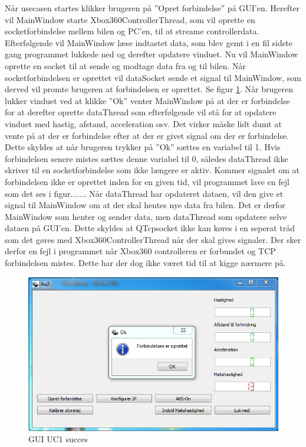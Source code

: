 Når usecasen startes klikker brugeren på ''Opret forbindelse'' på GUI'en. Herefter vil MainWindow starte Xbox360ControllerThread, som vil oprette en socketforbindelse mellem bilen og PC'en, til at streame controllerdata. Efterfølgende vil MainWindow læse indtastet data, som blev gemt i en fil sidste gang programmet lukkede ned og derefter opdatere vinduet. Nu vil MainWindow oprette en socket til at sende og modtage data fra og til bilen. Når socketforbindelsen er oprettet vil dataSocket sende et signal til MainWindow, som derved vil promte brugeren at forbindelsen er oprettet. Se figur \ref{fig:GUI_uc1_success}. Når brugeren lukker vinduet ved at klikke ''Ok'' venter MainWindow på at der er forbindelse for at derefter oprette dataThread som efterfølgende vil stå for at opdatere vinduet med hastig, afstand, acceleration osv. Det virker måske lidt dumt at vente på at der er forbindelse efter at der er givet signal om der er forbindelse. Dette skyldes at når brugeren trykker på ''Ok'' sættes en variabel til 1. Hvis forbindelsen senere mistes sættes denne variabel til 0, således dataThread ikke skriver til en socketforbindelse som ikke længere er aktiv. Kommer signalet om at forbindelsen ikke er oprettet inden for en given tid, vil programmet lave en fejl som det ses i figur....... Når dataThread har opdateret dataen, vil den give et signal til MainWindow om at der skal hentes nye data fra bilen. Det er derfor MainWindow som henter og sender data, men dataThread som opdatere selve dataen på GUI'en. Dette skyldes at QTcpsocket ikke kan køres i en seperat tråd som det gøres med Xbox360ControllerThread når der skal gives signaler. Der sker derfor en fejl i programmet når Xbox360 controlleren er forbundet og TCP forbindelsen mistes. Dette har der dog ikke været tid til at kigge nærmere på.  

\begin{figure}[H]
\centering
\includegraphics[width=\textwidth* 3/4,height=\textwidth* 9/20 ]{../fig/billeder/gui_uc1_success.png}
\caption{GUI UC1 succes}
\label{fig:GUI_uc1_success}
\end{figure}


